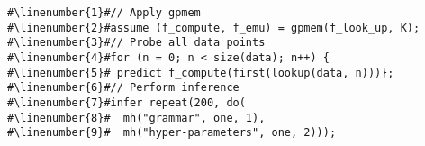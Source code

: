 \begin{mdframed}
\begin{minipage}{\linewidth}
\small
\belowcaptionskip=-10pt
\begin{lstlisting}[mathescape,label=alg:structureVent,basicstyle=\selectfont\ttfamily,numbers=none,caption={\gpmem\
inference for structure
learning: },escapechar=\#]
#\linenumber{1}#// Apply gpmem 
#\linenumber{2}#assume (f_compute, f_emu) = gpmem(f_look_up, K);
#\linenumber{3}#// Probe all data points
#\linenumber{4}#for (n = 0; n < size(data); n++) { 
#\linenumber{5}# predict f_compute(first(lookup(data, n)))};
#\linenumber{6}#// Perform inference
#\linenumber{7}#infer repeat(200, do(
#\linenumber{8}#  mh("grammar", one, 1),
#\linenumber{9}#  mh("hyper-parameters", one, 2)));
\end{lstlisting}

\end{minipage}
\end{mdframed}
